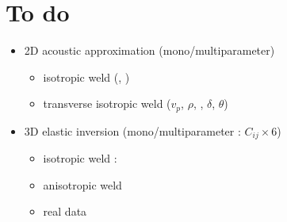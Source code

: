 \documentclass[11pt,xcolor=x11names,compress, notes=show]{beamer}%
\begin{document}
\section{To do}
\begin{frame}{\insertsectionhead}
	\begin{itemize}
		\item 2D acoustic approximation (mono/multiparameter)
		\begin{itemize}
			\item isotropic weld (, )
			\item transverse isotropic weld ($v_{p}$, $\rho$, , $\delta$, $\theta$)
		\end{itemize}
		\item 3D elastic inversion (mono/multiparameter : $C_{ij}\times$6)
		\begin{itemize}
			\item isotropic weld : 
			\item anisotropic weld
			\item real data
		\end{itemize}		
	\end{itemize}
\end{frame}
\end{document}
